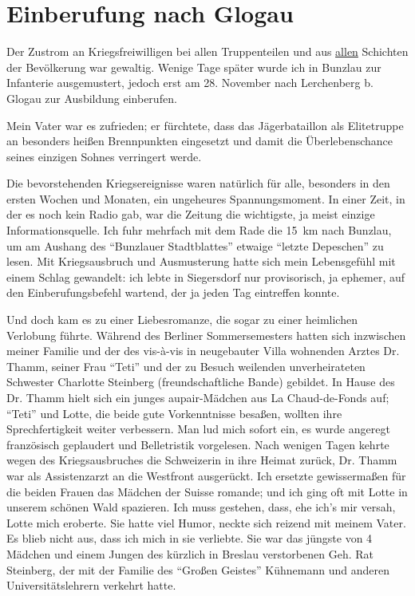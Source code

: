 \section{Einberufung nach Glogau}

Der Zustrom an Kriegsfreiwilligen bei allen Truppenteilen und aus \underline{allen} Schichten der Bevölkerung war gewaltig. Wenige Tage später wurde ich in Bunzlau zur Infanterie ausgemustert, jedoch erst am 28. November nach Lerchenberg b. Glogau zur Ausbildung einberufen.

Mein Vater war es zufrieden; er fürchtete, dass das Jägerbataillon als Elitetruppe an besonders heißen Brennpunkten eingesetzt und damit die Überlebenschance seines einzigen Sohnes verringert werde.

Die bevorstehenden Kriegsereignisse waren natürlich für alle, besonders in den ersten Wochen und Monaten, ein ungeheures Spannungsmoment. In einer Zeit, in der es noch kein Radio gab, war die Zeitung die wichtigste, ja meist einzige Informationsquelle. Ich fuhr mehrfach mit dem Rade die 15~km nach Bunzlau, um am Aushang des \enquote{Bunzlauer Stadtblattes} etwaige \enquote{letzte Depeschen} zu lesen. Mit Kriegsausbruch und Ausmusterung hatte sich mein Lebensgefühl mit einem Schlag gewandelt: ich lebte in Siegersdorf nur provisorisch, ja ephemer, auf den Einberufungsbefehl wartend, der ja jeden Tag eintreffen konnte.

Und doch kam es zu einer Liebesromanze, die sogar zu einer heimlichen Verlobung führte. Während des Berliner Sommersemesters hatten sich inzwischen meiner Familie und der des vis-à-vis in neugebauter Villa wohnenden Arztes Dr. Thamm, seiner Frau \enquote{Teti} und der zu Besuch weilenden unverheirateten Schwester Charlotte Steinberg (freundschaftliche Bande) gebildet. In Hause des Dr. Thamm hielt sich ein junges aupair-Mädchen aus La Chaud-de-Fonds auf; \enquote{Teti} und Lotte, die beide gute Vorkenntnisse besaßen, wollten ihre Sprechfertigkeit weiter verbessern. Man lud mich sofort ein, es wurde angeregt französisch geplaudert und Belletristik vorgelesen. Nach wenigen Tagen kehrte wegen des Kriegsausbruches die Schweizerin in ihre Heimat zurück, Dr. Thamm war als Assistenzarzt an die Westfront ausgerückt. Ich ersetzte gewissermaßen für die beiden Frauen das Mädchen der Suisse romande; und ich ging oft mit Lotte in unserem schönen Wald spazieren. Ich muss gestehen, dass, ehe ich's mir versah, Lotte mich eroberte. Sie hatte viel Humor, neckte sich reizend mit meinem Vater. Es blieb nicht aus, dass ich mich in sie verliebte. Sie war das jüngste von 4 Mädchen und einem Jungen des kürzlich in Breslau verstorbenen Geh. Rat Steinberg, der mit der Familie des \enquote{Großen Geistes} Kühnemann und anderen Universitätslehrern verkehrt hatte.

